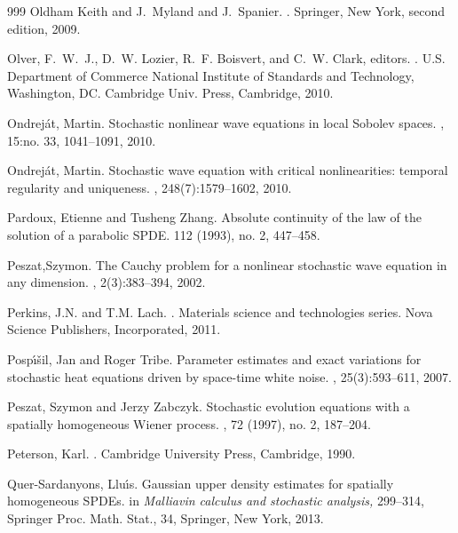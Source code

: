 \documentclass[a4paper,12pt]{article}
\theoremstyle{plain}
\theoremstyle{definition}
\newcommand{\ud}{\ensuremath{\mathrm{d}}}
\begin{document}
\begin{thebibliography}{999}
Oldham Keith and J.~Myland and J.~Spanier.
.
\newblock Springer, New York, second edition, 2009.

Olver, F.~W.~J.,  D.~W. Lozier, R.~F. Boisvert, and C.~W. Clark, editors.
.
\newblock U.S. Department of Commerce National Institute of Standar\ud s  and Technology, Washington, DC. Cambridge Univ. Press, Cambridge, 2010.

Ondrej{\'a}t, Martin.
\newblock Stochastic nonlinear wave equations in local {S}obolev spaces.
, 15:no. 33, 1041--1091, 2010.

Ondrej{\'a}t, Martin.
\newblock Stochastic wave equation with critical nonlinearities: temporal regularity and uniqueness.
, 248(7):1579--1602, 2010.

Pardoux, Etienne and Tusheng Zhang.
\newblock Absolute continuity of the law of the solution of a parabolic SPDE.
 112 (1993), no. 2, 447--458.


Peszat,Szymon.
\newblock The {C}auchy problem for a nonlinear stochastic wave equation in any dimension.
, 2(3):383--394, 2002.

Perkins, J.N. and T.M. Lach.
.
\newblock Materials science and technologies series. Nova Science Publishers, Incorporated, 2011.

Posp{\'{\i}}{\v{s}}il, Jan and Roger Tribe.
\newblock Parameter estimates and exact variations for stochastic heat equations driven by space-time white noise.
, 25(3):593--611, 2007.

Peszat, Szymon and Jerzy Zabczyk.
\newblock Stochastic evolution equations with a spatially homogeneous {W}iener process.
, 72 (1997), no. 2, 187--204.

Peterson, Karl.
.
\newblock Cambridge University Press, Cambridge, 1990.
	
Quer-Sardanyons, Llu{\'{\i}}s.
\newblock Gaussian upper density estimates for spatially homogeneous SPDEs.
\newblock in {\em Malliavin calculus and stochastic analysis,} 299--314,
\newblock Springer Proc. Math. Stat., 34, Springer, New York, 2013.



\end{thebibliography}
\end{document}
